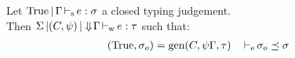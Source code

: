 \begin{corollary}[Principality]
  Let $\inferS{\Ctrue}{\E}{e}{\schm}$ a closed typing judgement.\\
  Then $\inferW{\Sv}{(C,\unif)}{\Eflat\E}{e}{\tau}$
  such that:
  \begin{align*}
    (\Ctrue,\schm_o) &= \generalize{C}{\unif\E}{\tau}
    &\entail{&}{\schm_o \preceq \schm}
  \end{align*}


\end{corollary}

